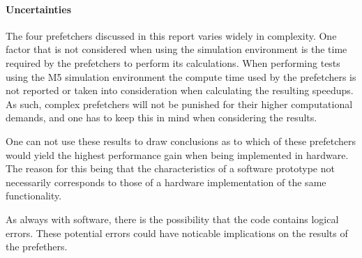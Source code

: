 \paragraph{Uncertainties}
\label{"waiting for reftex-label call..."}
The four prefetchers discussed in this report varies widely in
complexity. One factor that is not considered when using the
simulation environment is the time required by the prefetchers to
perform its calculations. When performing tests using the M5
simulation environment the compute time used by the prefetchers is not
reported or taken into consideration when calculating the resulting
speedups. As such, complex prefetchers will not be punished for their
higher computational demands, and one has to keep this in mind when
considering the results.

One can not use these results to draw conclusions as to which of these prefetchers would yield the highest performance gain when being implemented in hardware. The reason for this being that the characteristics of a software prototype not necessarily corresponds to those of a hardware implementation of the same functionality.

As always with software, there is the possibility that the code
contains logical errors. These potential errors could have noticable
implications on the results of the prefethers.
